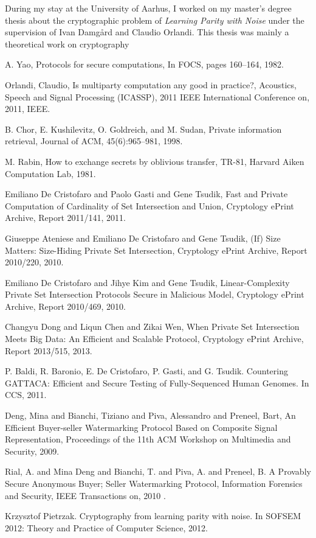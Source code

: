 \documentclass[dvips,12pt]{article}
\begin{document}
During my stay at the University of Aarhus, I worked on my master's degree thesis about the cryptographic problem of \emph{Learning Parity with Noise} \cite{lpn} under the supervision of Ivan Damg{\aa}rd and Claudio Orlandi. This thesis was mainly a theoretical work on cryptography
\begin{thebibliography}{99}

	A. Yao,
	Protocols for secure computations,	
	In FOCS, pages 160–164, 1982.

	Orlandi, Claudio,  	
  	Is multiparty computation any good in practice?,
  	{Acoustics, Speech and Signal Processing (ICASSP), 2011 IEEE International Conference on},
  	2011,
  	IEEE.

	B. Chor, E. Kushilevitz, O. Goldreich, and M. Sudan,	
	Private information retrieval,
	Journal of ACM, 45(6):965–981, 
	1998.

	M. Rabin,
	How to exchange secrets by oblivious transfer,
	TR-81, Harvard Aiken Computation Lab, 
	1981.

	Emiliano De Cristofaro and Paolo Gasti and Gene Tsudik,	
	Fast and Private Computation of Cardinality of Set Intersection and Union, 
    Cryptology ePrint Archive, Report 2011/141,
    2011.
    
	Giuseppe Ateniese and Emiliano De Cristofaro and Gene Tsudik,
    (If) Size Matters: Size-Hiding Private Set Intersection,
    Cryptology ePrint Archive, Report 2010/220,
	2010.

	Emiliano De Cristofaro and Jihye Kim and Gene Tsudik,	
	Linear-Complexity Private Set Intersection Protocols Secure in Malicious Model,
	Cryptology ePrint Archive, Report 2010/469,
	2010.

	Changyu Dong and Liqun Chen and Zikai Wen,
	When Private Set Intersection Meets Big Data: An Efficient and Scalable Protocol,
	Cryptology ePrint Archive, Report 2013/515,
	2013.
	
	P. Baldi, R. Baronio, E. De Cristofaro, P. Gasti, and G. Tsudik. 
	Countering GATTACA: Efficient and Secure Testing of Fully-Sequenced Human Genomes.
	In CCS, 
	2011.
	
	Deng, Mina and Bianchi, Tiziano and Piva, Alessandro and Preneel, Bart,
	An Efficient Buyer-seller Watermarking Protocol Based on Composite Signal Representation,
	Proceedings of the 11th ACM Workshop on Multimedia and Security,
	2009.
	
	Rial, A. and Mina Deng and Bianchi, T. and Piva, A. and Preneel, B.
	A Provably Secure Anonymous Buyer; Seller Watermarking Protocol,
	Information Forensics and Security, IEEE Transactions on,
	2010	.	

	Krzysztof Pietrzak. 
	Cryptography from learning parity with noise.
	In SOFSEM 2012: Theory and Practice of Computer Science,
	2012.
	

\end{thebibliography}
\end{document}
